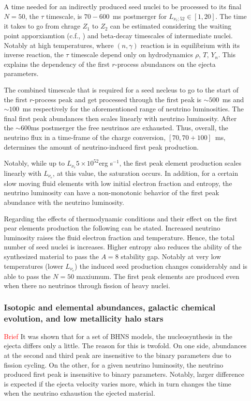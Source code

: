 \documentclass[11pt,a4paper,headinclude=true,DIV=14,BCOR=8mm,chapterprefix,listof=totoc,twoside,openright,abstracton]{scrbook}
\newcommand{\red}[1]{\textcolor{red}{#1}}
\begin{document}
A time needed for an indirectly produced seed nuclei to be processed to its final $N=50$, the $\tau$ timescale, is $70-600$~ms postmerger for $L_{\nu_e;52}\in[1,20]$. The time it takes to go from chrage $Z_1$ to $Z_2$ can be estimated considering the waiting point apporxiamtion (c.f., \cite{Kratz et al., 1993}) and beta-decay timescales of intermediate nuclei. Notably at high temperatures, where  $(n,\gamma)$ reaction is in equilibrium with its inverse reaction, the $\tau$ timescale depend only on hydrodynamics $\rho$, $T$, $Y_n$. 
This explains the dependency of the first $r$-process abundances on the ejecta parameters. 

The combined timescale that is required for a seed necleus to go to the start of the first $r$-process peak and get processed through the first peak is $\sim500$~ms and $\sim100$~ms respectively for the aforementioned range of neutrino luminosities. The final first peak abundances then scales linearly with neutrino luminosity. After the $\sim600$ms postmerger the free neutrinos are exhausted.
Thus, overall, the neutrino flux in a time-frame of the charge conversion, $[70, 70+100]$~ms, determines the amount of neutrino-induced first peak production. 

Notably, while up to $L_{\nu_e}5\times10^{52}$erg s$^{-1}$, the first peak element production scales linearly with $L_{\nu_e}$, at this value, the saturation occurs. In addition, for a certain slow moving fluid elements with low initial electron fraction and entropy, the neutrino luminosity can have a non-monotonic behavior of the first peak abundance with the neutrino luminosity.

Regarding the effects of thermodynamic conditions and their effect on the first pear elements production the following can be stated. Increased neutrino luminosity raises the fluid electron fraction and temperature. Hence, the total number of seed nuclei is increases. Higher entropy also reduces the ability of the synthesized material to pass the $A=8$ stability gap. Notably at very low temperatures (lower $L_{\nu_e}$) the induced seed production changes considerably and is able to pass the $N=50$ maxiumum. 
The first peak elements are produced even when there no neutrinos through fission of heavy nuclei.


\subsubsection{Isotopic and elemental abundances, galactic chemical evolution, and low metallicity halo stars}
\red{Brief}
It was shown that for a set of BHNS models, the nucleosynthesis in the ejecta differs only a little. The reason for this is twofold. On one side, abundances at the second and third peak are insensitive to the binary parameters due to fission cycling. On the other, for a given neutrino luminosity, the neutrino produced first peak is insensitive to binary parameters. Notably, larger difference is expected if the ejecta velocity varies more, which in turn changes the time when the neutrino exhaustion the ejected material.
\end{document}
